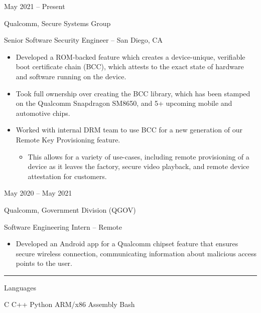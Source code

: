 \documentclass[a4paper]{article}
\newlength{\cvcolumngapwidth}
\newlength{\cvleftcolumnwidth}
\newlength{\cvrightcolumnwidth}
\newcommand{\cvsectionstyle}[1]{{\normalsize\cvsectionfont\textcolor{cvsectioncolor}{#1}}}
\newcommand{\cvtitlestyle}[1]{{\large\cvtitlefont\textcolor{cvtitlecolor}{#1}}}
\newcommand{\cvdurationstyle}[1]{{\small\cvdurationfont\textcolor{cvdurationcolor}{#1}}}
\newcommand{\italicstyle}[1]{{\small\italicfont\textcolor{cvsectioncolor}{#1}}}
\newlength{\cvafteritemskipamount}
\newlength{\cvaftersectionskipamount}
\newlength{\cvbeforesectionskipamount}
\newlength{\cvaftertitleskipamount}
\newlength{\cvparskip}
\newcommand{\cvsection}[1]{
    \vspace{\cvbeforesectionskipamount}

    \begin{minipage}[t]{\cvleftcolumnwidth}
        \raggedleft\cvsectionstyle{#1}
    \end{minipage}%
    \hspace{\cvcolumngapwidth}%
    \begin{minipage}[t]{\cvrightcolumnwidth}
        \textcolor{cvrulecolor}{\rule{\cvrightcolumnwidth}{0.3mm}}
    \end{minipage}

    \vspace{\cvaftersectionskipamount}
}
\newcommand{\cvitem}[2]{
    \begin{minipage}[t]{\cvleftcolumnwidth}
        \raggedleft #1
    \end{minipage}%
    \hspace{\cvcolumngapwidth}%
    \begin{minipage}[t]{\cvrightcolumnwidth}
        \setlength{\parskip}{\cvparskip} #2
    \end{minipage}

    \vspace{\cvafteritemskipamount}
}
\newcommand{\cvtitle}[1]{
    \cvtitlestyle{#1}

    \vspace{\cvaftertitleskipamount}
    \vspace{-\cvparskip}
}
\begin{document}
\cvitem{
    \cvdurationstyle{May 2021 -- Present}
}{
    \cvtitle{Qualcomm, Secure Systems Group}

    \italicstyle{Senior Software Security Engineer -- San Diego, CA}

    \normalsize
    \begin{itemize}[leftmargin=*]
      \item Developed a ROM-backed feature which creates a device-unique, verifiable boot certificate chain (BCC), which attests to the exact state of hardware and software running on the device.
      \item Took full ownership over creating the BCC library, which has been stamped on the Qualcomm Snapdragon SM8650, and 5+ upcoming mobile and automotive chips.
      \item Worked with internal DRM team to use BCC for a new generation of our Remote Key Provisioning feature.
        \begin{itemize}
          \item This allows for a variety of use-cases, including remote provisioning of a device as it leaves the factory, secure video playback, and remote device attestation for customers.
        \end{itemize}
    \end{itemize}
}

\vspace{6mm}

\cvitem{
    \cvdurationstyle{May 2020 -- May 2021}
}{
    \cvtitle{Qualcomm, Government Division (QGOV)}

    \italicstyle{Software Engineering Intern -- Remote}

    \normalsize
    \begin{itemize}[leftmargin=*]
        \item Developed an Android app for a Qualcomm chipset feature that ensures secure wireless connection,
          communicating information about malicious access points to the user.
    \end{itemize}
}


\cvsection{\LARGE \textcolor{emphasiscolor}{EXPERTISE}}

\cvitem{
    \cvdurationstyle{Languages}
}{
  C \hfill C++ \hfill Python \hfill ARM/x86 Assembly \hfill Bash
}

\vspace{6mm}
\end{document}
